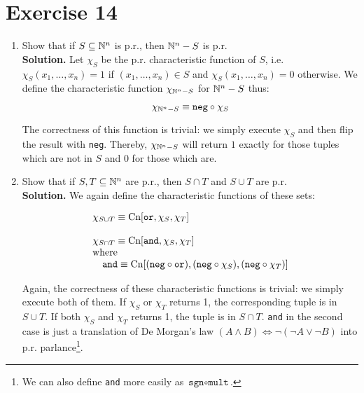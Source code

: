 \section{Exercise 14}

\begin{enumerate}
	\item Show that if $S \subseteq \mathbb{N}^n$ is p.r., then $\mathbb{N}^n - S$ is p.r.\\
	
	\textbf{Solution.} Let $\chi_S$ be the p.r. characteristic function of $S$, i.e. $\chi_S(x_1,\dots,x_n) = 1$ if $(x_1,\dots,x_n) \in S$ and $\chi_S(x_1,\dots,x_n) = 0$ otherwise. We define the characteristic function $\chi_{\mathbb{N}^n - S}$ for $\mathbb{N}^n - S$ thus:
	
	$$
		\chi_{\mathbb{N}^n - S} \equiv \texttt{neg} \circ \chi_S
	$$
	
	The correctness of this function is trivial: we simply execute $\chi_S$ and then flip the result with \texttt{neg}. Thereby, $\chi_{\mathbb{N}^n - S}$ will return $1$ exactly for those tuples which are not in $S$ and 0 for those which are.
	
	\item Show that if $S, T \subseteq \mathbb{N}^n$ are p.r., then $S \cap T$ and $S \cup T$ are p.r.\\
	
	\textbf{Solution.} We again define the characteristic functions of these sets:
	
	$$
		\begin{array}{l}
		\chi_{S \cup T} \equiv \textnormal{Cn}[\texttt{or}, \chi_S,\chi_T]\\
		\\
		\chi_{S \cap T} \equiv \textnormal{Cn}[\texttt{and}, \chi_S,\chi_T]\\
		\textnormal{where}\\
		\quad \texttt{and} \equiv \textnormal{Cn}[(\texttt{neg} \circ \texttt{or}), (\texttt{neg} \circ \chi_S), (\texttt{neg} \circ \chi_T)]
		\end{array}
	$$
	
	Again, the correctness of these characteristic functions is trivial: we simply execute both of them. If $\chi_S$ or $\chi_T$ returns 1, the corresponding tuple is in $S \cup T$. If both $\chi_S$ and $\chi_T$ returns 1, the tuple is in $S \cap T$. \texttt{and} in the second case is just a translation of De Morgan's law $(A \wedge B) \Leftrightarrow \neg (\neg A \vee \neg B)$ into p.r. parlance\footnote{We can also define \texttt{and} more easily as $\texttt{sgn} \circ \texttt{mult}$.}.
	

\end{enumerate}
